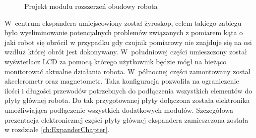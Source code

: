 \begin{figure}[h!]
 \centering
 \caption{Projekt modułu rozszerzeń obudowy robota}
 \label{fig:SensorsBoard}
\end{figure}

W~centrum ekspandera umiejscowiony został żyroskop, celem takiego zabiegu było
wyeliminowanie potencjalnych problemów związanych z pomiarem kąta o jaki robot
się obrócił w przypadku gdy czujnik pomiarowy nie znajduje się na osi wzdłuż
której obrót jest dokonywany. W~południowej części umieszczony został
wyświetlacz LCD za pomocą którego użytkownik będzie mógł na bieżąco monitorować
aktualne działania robota. W~północnej części zamontowany został akcelerometr
oraz magnetometr. Taka konfiguracja pozwoliła na ograniczenie ilości i długości
przewodów potrzebnych do podłączenia wszystkich elementów do płyty głównej
robota. Do tak przygotowanej płyty dołączona została elektronika umożliwiająca
podłączenie wszystkich dodatkowych modułów. Szczegółowa prezentacja
elektronicznej części płyty głównej ekspandera zamieszczona została w rozdziale
\ref{ch:ExpanderChapter}. 

